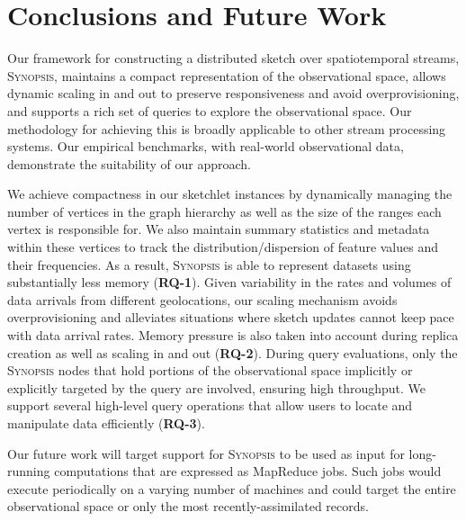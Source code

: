 \section{Conclusions and Future Work}
\label{sec:conclusions}
Our framework for constructing a distributed sketch over spatiotemporal streams, \textsc{Synopsis}, maintains a compact representation of the observational space, allows dynamic scaling in and out to preserve responsiveness and avoid overprovisioning, and supports a rich set of queries to explore the observational space. Our methodology for achieving this is broadly applicable to other stream processing systems.  Our empirical benchmarks, with real-world observational data, demonstrate the suitability of our approach.

We achieve compactness in our sketchlet instances by dynamically managing the number of vertices in the graph hierarchy as well as the size of the ranges each vertex is responsible for. We also maintain summary statistics and metadata within these vertices to track the distribution/dispersion of feature values and their frequencies. As a result, \textsc{Synopsis} is able to represent datasets using substantially less memory (\textbf{RQ-1}). Given variability in the rates and volumes of data arrivals from different geolocations, our scaling mechanism avoids overprovisioning and alleviates situations where sketch updates cannot keep pace with data arrival rates. Memory pressure is also taken into account during replica creation as well as scaling in and out (\textbf{RQ-2}). During query evaluations, only the \textsc{Synopsis} nodes that hold portions of the observational space implicitly or explicitly targeted by the query are involved, ensuring high throughput. We support several high-level query operations that allow users to locate and manipulate data efficiently (\textbf{RQ-3}).

Our future work will target support for \textsc{Synopsis} to be used as input for long-running computations that are expressed as MapReduce jobs. Such jobs would execute periodically on a varying number of machines and could target the entire observational space or only the most recently-assimilated records.

